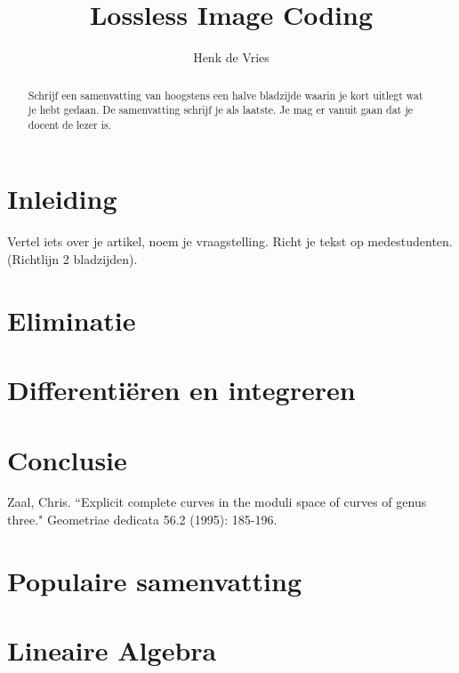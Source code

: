 \documentclass[bachelorscriptie]{uvamath}%
\title{Lossless Image Coding}
\author[henk@science.uva.nl, 6127901]{Henk de Vries}
\begin{document}
\maketitle

\begin{abstract}
Schrijf een samenvatting van hoogstens een halve bladzijde waarin je kort uitlegt wat je hebt gedaan. De samenvatting schrijf je als laatste. Je mag er vanuit gaan dat je docent de lezer is.
\end{abstract}

\tableofcontents

\chapter{Inleiding}
Vertel iets over je artikel, noem je vraagstelling. Richt je tekst op medestudenten. (Richtlijn 2 bladzijden).

\chapter{Eliminatie}
\lipsum[1-3]

\chapter{Differenti\"eren en integreren}
\lipsum[1-3]

\chapter{Conclusie}
\lipsum[1-3]


\clearpage%
\begin{thebibliography}{}
Zaal, Chris. ``Explicit complete curves in the moduli space of curves of genus three." Geometriae dedicata 56.2 (1995): 185-196.
\end{thebibliography}

\clearpage%
\chapter*{Populaire samenvatting}
\lipsum[1-2]

\appendix

\chapter{Lineaire Algebra}
\lipsum[1-3]
\end{document}
